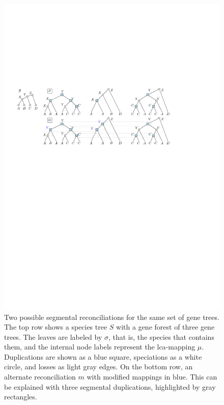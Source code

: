 \documentclass[10pt]{article}
\begin{document}
\begin{figure}[htb]
    \centering
    \includegraphics[width=0.8\linewidth]{figs_theory/fig1.pdf}
    \caption{Two possible segmental reconciliations for the same set of gene trees.  The top row shows a species tree $S$ with a gene forest of three gene trees.  The leaves are labeled by $\sigma$, that is, the species that contains them, and the internal node labels represent the lca-mapping $\mu$. 
    Duplications are shown as a blue square,  speciations as a white circle, and losses as light gray edges.
    On the bottom row, an alternate reconciliation $m$ with modified mappings in blue.  This can be explained with three segmental duplications, highlighted by gray rectangles.
    }
    \label{fig:fig1}
\end{figure}
\end{document}

